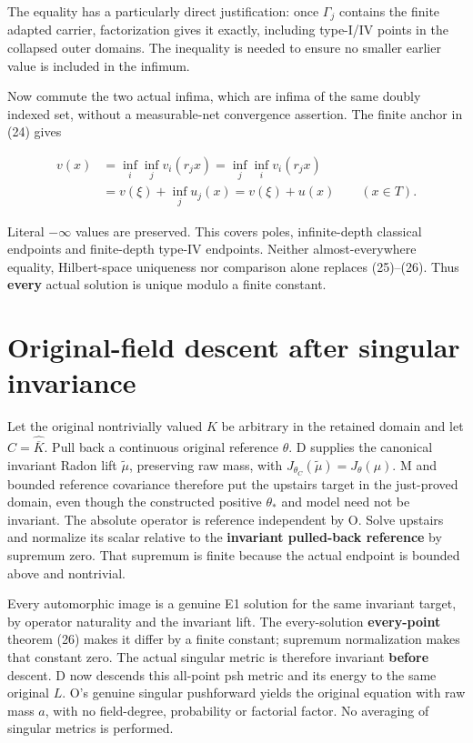 \documentclass[
  11pt,
]{article}
\begin{document}
The equality has a particularly direct justification: once \(\Gamma_j\)
contains the finite adapted carrier, factorization gives it exactly,
including type-I/IV points in the collapsed outer domains. The
inequality is needed to ensure no smaller earlier value is included in
the infimum.

Now commute the two actual infima, which are infima of the same doubly
indexed set, without a measurable-net convergence assertion. The finite
anchor in (24) gives

\[
 \begin{aligned}
 v(x)&=\inf_i\inf_jv_i(r_jx)
      =\inf_j\inf_iv_i(r_jx)\\
     &=v(\xi)+\inf_ju_j(x)=v(\xi)+u(x)\qquad(x\in T).
 \end{aligned}                                                     \tag{26}
\]

Literal \(-\infty\) values are preserved. This covers poles,
infinite-depth classical endpoints and finite-depth type-IV endpoints.
Neither almost-everywhere equality, Hilbert-space uniqueness nor
comparison alone replaces (25)--(26). Thus \textbf{every} actual
solution is unique modulo a finite constant.

\section{Original-field descent after singular
invariance}\label{original-field-descent-after-singular-invariance}

Let the original nontrivially valued \(K\) be arbitrary in the retained
domain and let \(C=\widehat{\overline K}\). Pull back a continuous
original reference \(\theta\). D supplies the canonical invariant Radon
lift \(\widetilde\mu\), preserving raw mass, with
\(J_{\theta_C}(\widetilde\mu)=J_\theta(\mu)\). M and bounded reference
covariance therefore put the upstairs target in the just-proved domain,
even though the constructed positive \(\theta_*\) and model need not be
invariant. The absolute operator is reference independent by O. Solve
upstairs and normalize its scalar relative to the \textbf{invariant
pulled-back reference} by supremum zero. That supremum is finite because
the actual endpoint is bounded above and nontrivial.

Every automorphic image is a genuine E1 solution for the same invariant
target, by operator naturality and the invariant lift. The
every-solution \textbf{every-point} theorem (26) makes it differ by a
finite constant; supremum normalization makes that constant zero. The
actual singular metric is therefore invariant \textbf{before} descent. D
now descends this all-point psh metric and its energy to the same
original \(L\). O's genuine singular pushforward yields the original
equation with raw mass \(a\), with no field-degree, probability or
factorial factor. No averaging of singular metrics is performed.
\end{document}

